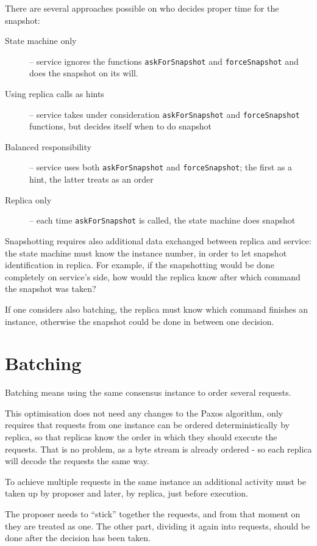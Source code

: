 There are several approaches possible on who decides proper time for the snapshot:
\begin{description} 
 \item[State machine only] -- service ignores the functions \texttt{askForSnapshot} and \texttt{forceSnapshot} and does the snapshot on its will.
 \item[Using replica calls as hints] -- service takes under consideration \texttt{askForSnapshot} and \texttt{fo\-rceSnapshot} functions, but decides itself when to do snapshot
 \item[Balanced responsibility] -- service uses both \texttt{askForSnapshot} and \texttt{forceSnapshot}; the first as a hint, the latter treats as an order
 \item[Replica only] -- each time \texttt{askForSnapshot} is called, the state machine does snapshot
\end{description}

Snapshotting requires also additional data exchanged between replica and service: the state machine must know the instance number, in order to let snapshot identification in replica. For example, if the snapshotting would be done completely on service's side, how would the replica know after which command the snapshot was taken?

If one considers also batching, the replica must know which command finishes an instance, otherwise the snapshot could be done in between one decision.

\section{Batching}
\label{sec:Batching}
Batching means using the same consensus instance to order several requests.

This optimisation does not need any changes to the Paxos algorithm, only requires that requests from one instance can be ordered deterministically by replica, so that replicas know the order in which they should execute the requests. That is no problem, as a byte stream is already ordered - so each replica will decode the requests the same way.

To achieve multiple requests in the same instance an additional activity must be taken up by proposer and later, by replica, just before execution.

The proposer needs to ``stick'' together the requests, and from that moment on they are treated as one. The other part, dividing it again into requests, should be done after the decision has been taken.

